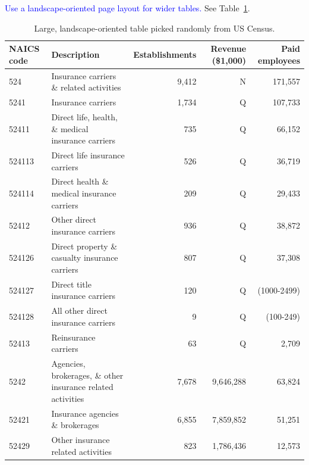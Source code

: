 \textcolor{blue}{Use a landscape-oriented page layout for wider tables.} See Table~\ref{tab:my-table3}.

\begin{landscape}
\centering
\thispagestyle{rotate}
\begin{table}[!htb]
\centering
\caption{Large, landscape-oriented table picked randomly from US Census. }
\label{tab:my-table3}
\begin{tabular}{|l|l|r|r|r|}

\hline
\textbf{NAICS code} & \textbf{Description}                                          & \textbf{Establishments} & \textbf{Revenue (\$1,000)} & \textbf{Paid employees} \\ \hline
524    & Insurance carriers \& related activities             & 9,412 & N         & 171,557     \\ \hline
5241   & Insurance   carriers                                 & 1,734 & Q         & 107,733     \\ \hline
52411  & Direct life, health, \& medical   insurance carriers & 735   & Q         & 66,152      \\ \hline
524113 & Direct   life insurance carriers                     & 526   & Q         & 36,719      \\ \hline
524114 & Direct health \& medical insurance   carriers        & 209   & Q         & 29,433      \\ \hline
52412  & Other   direct insurance carriers                    & 936   & Q         & 38,872      \\ \hline
524126 & Direct   property \& casualty insurance carriers     & 807   & Q         & 37,308      \\ \hline
524127 & Direct   title insurance carriers                    & 120   & Q         & (1000-2499) \\ \hline
524128 & All   other direct insurance carriers                & 9     & Q         & (100-249)   \\ \hline
52413  & Reinsurance   carriers                               & 63    & Q         & 2,709       \\ \hline
5242                & Agencies,   brokerages, \& other insurance related activities & 7,678                   & 9,646,288                  & 63,824                  \\ \hline
52421  & Insurance   agencies \& brokerages                   & 6,855 & 7,859,852 & 51,251      \\ \hline
52429  & Other   insurance related activities                 & 823   & 1,786,436 & 12,573      \\ \hline

\end{tabular}
\end{table}
\end{landscape}
